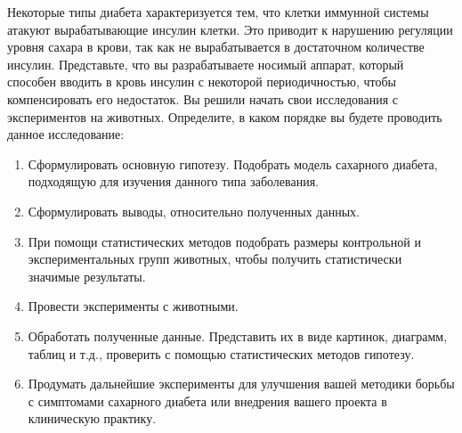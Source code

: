 
Некоторые типы
диабета характеризуется тем, что клетки иммунной системы атакуют вырабатывающие
инсулин клетки. Это приводит к нарушению регуляции уровня сахара в крови, так
как не вырабатывается в достаточном количестве инсулин. Представьте, что вы
разрабатываете носимый аппарат, который способен вводить в кровь инсулин с
некоторой периодичностью, чтобы компенсировать его недостаток. Вы решили начать
свои исследования с экспериментов на животных. Определите, в каком порядке вы
будете проводить данное исследование:

\begin{enumerate}
    \item Сформулировать основную гипотезу. Подобрать модель сахарного диабета, подходящую для изучения данного типа заболевания.
    \item Сформулировать выводы, относительно полученных данных.
    \item При помощи статистических методов подобрать размеры контрольной и экспериментальных групп животных, чтобы получить статистически значимые результаты.
    \item Провести эксперименты с животными.
    \item Обработать полученные данные. Представить их в виде картинок, диаграмм, таблиц и т.д., проверить с помощью статистических методов гипотезу.
    \item Продумать дальнейшие эксперименты для улучшения вашей методики борьбы с симптомами сахарного диабета или внедрения вашего проекта в клиническую практику.
\end{enumerate}



